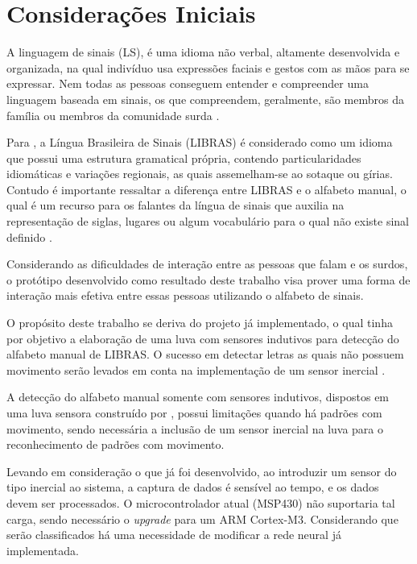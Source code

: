 \chapter{Considerações Iniciais} \label{consideracoes_iniciais}
A linguagem de sinais (LS), é uma idioma não verbal, altamente desenvolvida e organizada, na qual indivíduo usa expressões faciais 
e gestos com as mãos para se expressar. Nem todas as pessoas conseguem entender e compreender uma linguagem baseada em sinais, os 
que compreendem, geralmente, são membros da família ou membros da comunidade surda \cite{smartglovecommunication}.

Para , a Língua Brasileira de Sinais (LIBRAS) é considerado como um idioma que possui uma estrutura 
gramatical própria, contendo particularidades idiomáticas e variações regionais, as quais assemelham-se ao sotaque ou gírias. 
Contudo é importante ressaltar a diferença entre LIBRAS e o alfabeto manual, o qual é um recurso para os falantes da língua de 
sinais que auxilia na representação de siglas, lugares ou algum vocabulário para o qual não existe sinal definido \cite{LIBRAS?}.

Considerando as dificuldades de interação entre as pessoas que falam e os surdos, o protótipo desenvolvido como resultado deste 
trabalho visa prover uma forma de interação mais efetiva entre essas pessoas utilizando o alfabeto de sinais.

O propósito deste trabalho se deriva do projeto já implementado, o qual tinha por objetivo a elaboração de uma luva com sensores 
indutivos para detecção do alfabeto manual de LIBRAS. O sucesso em detectar letras as quais não possuem movimento serão levados em 
conta na implementação de um sensor inercial \cite[p. 95]{RUANI}.

A detecção do alfabeto manual somente com sensores indutivos, dispostos em uma luva sensora construído por , 
possui limitações quando há padrões com movimento, sendo necessária a inclusão de um sensor inercial na luva para o reconhecimento 
de padrões com movimento.

Levando em consideração o que já foi desenvolvido, ao introduzir um sensor do tipo inercial ao sistema, a captura de dados é sensível ao tempo, e os dados devem ser processados. O microcontrolador atual (MSP430) não suportaria tal carga, sendo necessário o \textit{upgrade} para um ARM Cortex-M3. 
Considerando que serão classificados há uma necessidade de modificar a rede neural já implementada.

